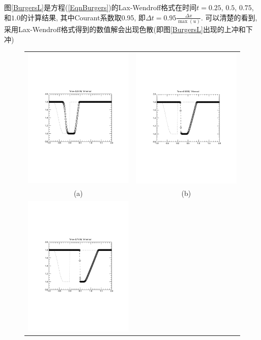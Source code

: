 \documentclass[10.5pt
]{article}
\begin{document}
图\ref{BurgersL}是方程(\ref{EqnBurgers})的Lax-Wendroff格式在时间$t = 0.25$, $0.5$, $0.75$, 和$1.0$的计算结果, 其中Courant系数取0.95, 即$\Delta t = 0.95 \frac{\Delta x}{\max(u)}$. 可以清楚的看到, 采用Lax-Wendroff格式得到的数值解会出现色散(即图\ref{BurgersL}出现的上冲和下冲)
\begin{figure}[htb]
	\begin{center}
		\begin{tabular}{cc}
			\includegraphics[width=.45\textwidth]{fig2_1_1}
			&
			\includegraphics[width=.45\textwidth]{fig2_1_2}
			\\[-10pt]
			(a) & (b)
			\\
			\includegraphics[width=.45\textwidth]{fig2_1_3}

\end{tabular}
\end{center}
\end{figure}
\end{document}
